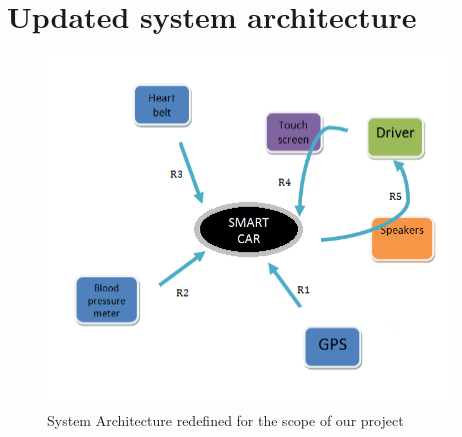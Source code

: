 \section{Updated system architecture}
\begin{figure}[h]
	\centering
	\includegraphics[scale=0.8]{./images/implementationArchitecture}		%
	\caption{System Architecture redefined for the scope of our project}					%
	\label{fig:impsys}									%
\end{figure}